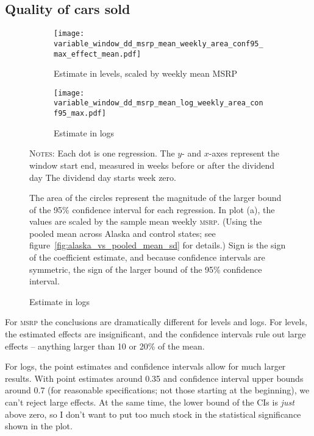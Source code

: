 \documentclass[11pt,letterpaper,oneside]{article}
\newcommand{\msrp}{\textsc{msrp}}
\begin{document}
\begin{doublespacing}
\subsection{Quality of cars sold}

\begin{figure}[hbt]
    \caption{MSRP effects with varying windows}  %
    \begin{subfigure}{\linewidth}
        \caption{Estimate in levels, scaled by weekly mean MSRP}
        \texttt{[image: variable\_window\_dd\_msrp\_mean\_weekly\_area\_conf95\_max\_effect\_mean.pdf]}
    \end{subfigure}
    \begin{subfigure}{\linewidth}
        \caption{Estimate in logs}
        \texttt{[image: variable\_window\_dd\_msrp\_mean\_log\_weekly\_area\_conf95\_max.pdf]}
    \end{subfigure}


    {\footnotesize
    \textsc{Notes:}
    Each dot is one regression.
    The $y$- and $x$-axes represent the window start end, measured in weeks before or after the dividend day
    The dividend day starts week zero.

     The area of the circles represent the magnitude of the larger bound of the 95\% confidence interval for each regression.
    In plot (a), the values are scaled by the sample mean weekly \msrp{}.
    (Using the pooled mean across Alaska and control states; see figure~\ref{fig:alaska_vs_pooled_mean_sd} for details.)
    Sign is the sign of the coefficient estimate, and because confidence intervals are symmetric, the sign of the larger bound of the 95\% confidence interval.
    }
\end{figure}


For \msrp{} the conclusions are dramatically different for levels and logs.
    For levels, the estimated effects are insignificant, and the confidence intervals rule out large effects -- anything larger than 10 or 20\% of the mean.

    For logs, the point estimates and confidence intervals allow for much larger results.
    With point estimates around 0.35 and confidence interval upper bounds around 0.7 (for reasonable specifications; not those starting at the beginning), we can't reject large effects.
    At the same time, the lower bound of the CIs is \emph{just} above zero, so I don't want to put too much stock in the statistical significance shown in the plot.



\end{doublespacing}
\end{document}
